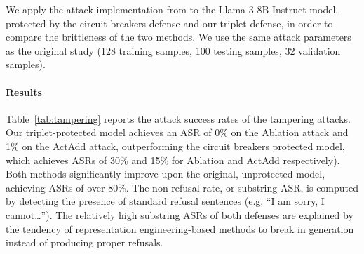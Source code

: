 \documentclass[11pt]{article}
\begin{document}
We apply the attack implementation from \citet{arditi2024refusalsingledirection} to the Llama 3 8B Instruct model, protected by the circuit breakers defense and our triplet defense, in order to compare the brittleness of the two methods. We use the same attack parameters as the original study (128 training samples, 100 testing samples, 32 validation samples).

\begin{table}[ht]
    \centering
{}
    \caption{Attack Success Rates (ASR) across the Directional Ablation and Activation Addition (ActAdd) tampering attacks. The non-refusal rate, or substring ASR, is detected by the presence of refusal string, e.g ``I am sorry, I cannot\ldots''. The HB ASR is computed using the HarmBench Llama2Guard judge.}
    \label{tab:tampering}
\end{table}


\paragraph{Results}
Table~\ref{tab:tampering} reports the attack success rates of the tampering attacks.
Our triplet-protected model achieves an ASR of 0\% on the Ablation attack and 1\% on the ActAdd attack, outperforming the circuit breakers protected model, which achieves ASRs of 30\% and 15\% for Ablation and ActAdd respectively).
Both methods significantly improve upon the original, unprotected model, achieving ASRs of over 80\%.
The non-refusal rate, or substring ASR, is computed by detecting the presence of standard refusal sentences (e.g, ``I am sorry, I cannot\ldots''). The relatively high substring ASRs of both defenses are explained by the tendency of representation engineering-based methods to break in generation instead of producing proper refusals.
\end{document}
